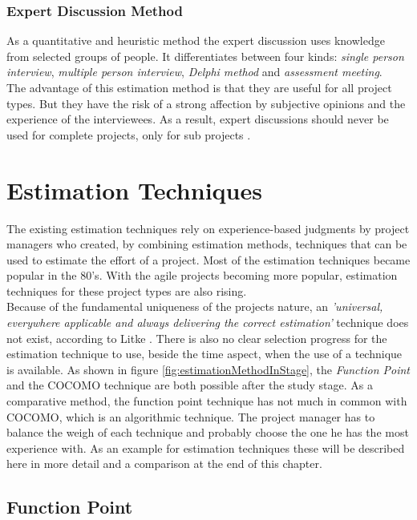 \subsubsection{Expert Discussion Method}

As a quantitative and heuristic method the expert discussion uses knowledge from selected groups of people. It differentiates between four kinds: \textit{single person interview}, \textit{multiple person interview}, \textit{Delphi method} and \textit{assessment meeting}.\\
The advantage of this estimation method is that they are useful for all project types. But they have the risk of a strong affection by subjective opinions and the experience of the interviewees. As a result, expert discussions should never be used for complete projects, only for sub projects \cite{itplanung}.\\

\section{Estimation Techniques}

The existing estimation techniques rely on experience-based judgments by project managers
who created, by combining estimation methods, techniques that can be used to estimate the effort of a project. Most of the estimation techniques became popular in the 80's. With the agile projects becoming more popular, estimation techniques for these project types are also rising. \\
Because of the fundamental uniqueness of the projects nature, an \textit{'universal, everywhere applicable and always delivering the correct estimation'} technique does not exist, according to Litke \cite{litke}. There is also no clear selection progress for the estimation technique to use, beside the time aspect, when the use of a technique is available. As shown in figure \ref{fig:estimationMethodInStage}, the \textit{Function Point} and the COCOMO technique are both possible after the study stage. As a comparative method, the function point technique has not much in common with COCOMO, which is an algorithmic technique. The project manager has to balance the weigh of each technique and probably choose the one he has the most experience with. As an example for estimation techniques these will be described here in more detail and a comparison at the end of this chapter.


\subsection{Function Point} \label{FPMethod}

